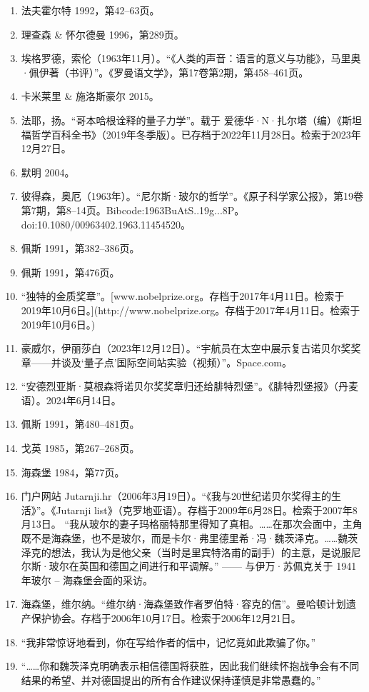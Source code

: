\begin{enumerate}
\item 法夫霍尔特 1992，第42–63页。
\item 理查森 & 怀尔德曼 1996，第289页。
\item 埃格罗德，索伦（1963年11月）。“《人类的声音：语言的意义与功能》，马里奥·佩伊著（书评）”。《罗曼语文学》，第17卷第2期，第458–461页。
\item 卡米莱里 & 施洛斯豪尔 2015。
\item 法耶，扬。“哥本哈根诠释的量子力学”。载于 爱德华·N·扎尔塔（编）《斯坦福哲学百科全书》（2019年冬季版）。已存档于2022年11月28日。检索于2023年12月27日。
\item 默明 2004。
\item 彼得森，奥厄（1963年）。“尼尔斯·玻尔的哲学”。《原子科学家公报》，第19卷第7期，第8–14页。Bibcode:1963BuAtS..19g...8P。doi:10.1080/00963402.1963.11454520。
\item 佩斯 1991，第382–386页。
\item 佩斯 1991，第476页。
\item “独特的金质奖章”。[www.nobelprize.org。存档于2017年4月11日。检索于2019年10月6日。](http://www.nobelprize.org。存档于2017年4月11日。检索于2019年10月6日。)
\item 豪威尔，伊丽莎白（2023年12月12日）。“宇航员在太空中展示复古诺贝尔奖奖章——并谈及‘量子点’国际空间站实验（视频）”。Space.com。
\item “安德烈亚斯·莫根森将诺贝尔奖奖章归还给腓特烈堡”。《腓特烈堡报》（丹麦语）。2024年6月14日。
\item 佩斯 1991，第480–481页。
\item 戈英 1985，第267–268页。
\item 海森堡 1984，第77页。
\item 门户网站 Jutarnji.hr（2006年3月19日）。“《我与20世纪诺贝尔奖得主的生活》”。《Jutarnji list》（克罗地亚语）。存档于2009年6月28日。检索于2007年8月13日。
“我从玻尔的妻子玛格丽特那里得知了真相。……在那次会面中，主角既不是海森堡，也不是玻尔，而是卡尔·弗里德里希·冯·魏茨泽克。……魏茨泽克的想法，我认为是他父亲（当时是里宾特洛甫的副手）的主意，是说服尼尔斯·玻尔在英国和德国之间进行和平调解。”
—— 与伊万·苏佩克关于 1941 年玻尔 – 海森堡会面的采访。
\item 海森堡，维尔纳。“维尔纳·海森堡致作者罗伯特·容克的信”。曼哈顿计划遗产保护协会。存档于2006年10月17日。检索于2006年12月21日。
\item “我非常惊讶地看到，你在写给作者的信中，记忆竟如此欺骗了你。”
\item “……你和魏茨泽克明确表示相信德国将获胜，因此我们继续怀抱战争会有不同结果的希望、并对德国提出的所有合作建议保持谨慎是非常愚蠢的。”

\end{enumerate}
